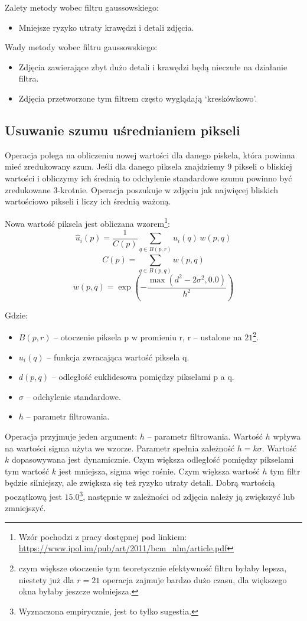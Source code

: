 \documentclass[]{mwart}
\begin{document}
Zalety metody wobec filtru gaussowskiego:
\begin{itemize}
    \item Mniejsze ryzyko utraty krawędzi i detali zdjęcia.
\end{itemize}

Wady metody wobec filtru gaussowskiego:
\begin{itemize}
    \item Zdjęcia zawierające zbyt dużo detali i krawędzi będą nieczułe na działanie filtra.
    \item Zdjęcia przetworzone tym filtrem często wyglądają `kreskówkowo'.
\end{itemize}


\subsection{Usuwanie szumu uśrednianiem pikseli}
Operacja polega na obliczeniu nowej wartości dla danego piskela, która powinna mieć
zredukowany szum. Jeśli dla danego piksela znajdziemy $9$ pikseli o bliskiej wartości i obliczymy
ich średnią to odchylenie standardowe szumu powinno być zredukowane $3$-krotnie. Operacja
poszukuje w zdjęciu jak najwięcej bliskich wartościowo pikseli i liczy ich średnią ważoną.

Nowa wartość piksela jest obliczana wzorem\footnote{Wzór pochodzi z pracy dostępnej pod linkiem: \url{https://www.ipol.im/pub/art/2011/bcm_nlm/article.pdf} }:
\[ \hat{u}_i(p) = \frac{1}{C(p)} \sum_{q \in B(p, r)} u_i(q) \, w(p, q)\]
\[ C(p) = \sum_{q \in B(p,q)}^{}w(p,q) \]
\[ w(p,q) = \exp(-\frac{\max (d^2-2\sigma^2, 0.0)}{h^2})\]

Gdzie:
\begin{itemize}
    \item $B(p,r)$ -- otoczenie piksela p w promieniu r, r -- ustalone na $21$\footnote{czym większe otoczenie tym teoretycznie efektywność filtru byłaby lepsza, niestety już dla $r=21$ operacja zajmuje bardzo dużo czasu, dla większego okna byłaby jeszcze wolniejsza.}.
    \item $u_i(q)$ -- funkcja zwracająca wartość piksela q.
    \item $d(p, q)$ -- odległość euklidesowa pomiędzy pikselami p a q.
    \item $\sigma$ -- odchylenie standardowe.
    \item $h$ -- parametr filtrowania.
\end{itemize}

Operacja przyjmuje jeden argument: $h$ -- parametr filtrowania.
Wartość $h$ wpływa na wartości sigma użyta we wzorze.
Parametr spełnia zależność $h = k\sigma$. Wartość $k$ dopasowywana jest dynamicznie. Czym
większa odległość pomiędzy pikselami tym wartość $k$ jest mniejsza, sigma więc rośnie.
Czym większa wartość $h$ tym filtr będzie silniejszy, ale zwiększa się też ryzyko utraty detali.
Dobrą wartością początkową jest $15.0$\footnote{Wyznaczona empirycznie, jest to tylko sugestia.}, następnie w zależności od zdjęcia należy ją zwiększyć lub
zmniejszyć. \newline
\end{document}
